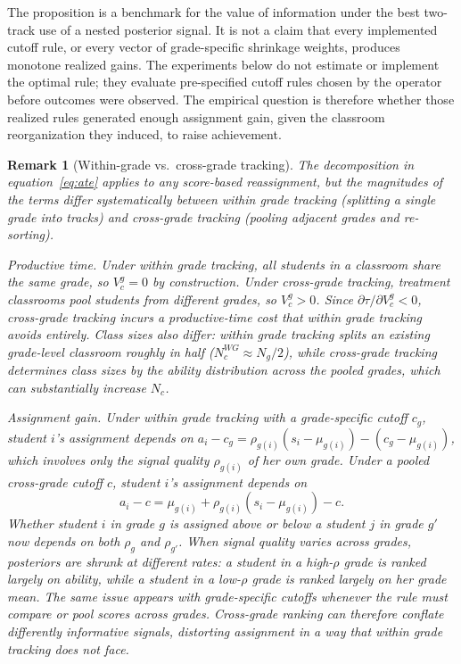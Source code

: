 \documentclass[11pt]{article}
\newtheorem{remark}{Remark}
\begin{document}
The proposition is a benchmark for the value of information under the best two-track use of a nested posterior signal. It is not a claim that every implemented cutoff rule, or every vector of grade-specific shrinkage weights, produces monotone realized gains. The experiments below do not estimate or implement the optimal rule; they evaluate pre-specified cutoff rules chosen by the operator before outcomes were observed. The empirical question is therefore whether those realized rules generated enough assignment gain, given the classroom reorganization they induced, to raise achievement.

\begin{remark}[Within-grade vs.\ cross-grade tracking]
\label{rem:wg_cg}
The decomposition in equation~\eqref{eq:ate} applies to any score-based reassignment, but the magnitudes of the terms differ systematically between within grade tracking (splitting a single grade into tracks) and cross-grade tracking (pooling adjacent grades and re-sorting).

\emph{Productive time.} Under within grade tracking, all students in a classroom share the same grade, so $V^g_c = 0$ by construction. Under cross-grade tracking, treatment classrooms pool students from different grades, so $V^g_c > 0$. Since $\partial\tau/\partial V^g_c < 0$, cross-grade tracking incurs a productive-time cost that within grade tracking avoids entirely. Class sizes also differ: within grade tracking splits an existing grade\mbox{-}level classroom roughly in half ($N^{WG}_c \approx N_g/2$), while cross-grade tracking determines class sizes by the ability distribution across the pooled grades, which can substantially increase $N_c$.

\emph{Assignment gain.} Under within grade tracking with a grade-specific cutoff $c_g$, student $i$'s assignment depends on $a_i - c_g = \rho_{g(i)}(s_i - \mu_{g(i)}) - (c_g - \mu_{g(i)})$, which involves only the signal quality $\rho_{g(i)}$ of her own grade. Under a pooled cross-grade cutoff $c$, student $i$'s assignment depends on
\begin{equation}
\label{eq:cg_assign}
a_i - c = \mu_{g(i)} + \rho_{g(i)}(s_i - \mu_{g(i)}) - c.
\end{equation}
Whether student $i$ in grade $g$ is assigned above or below a student $j$ in grade $g'$ now depends on both $\rho_g$ and $\rho_{g'}$. When signal quality varies across grades, posteriors are shrunk at different rates: a student in a high-$\rho$ grade is ranked largely on ability, while a student in a low-$\rho$ grade is ranked largely on her grade mean. The same issue appears with grade-specific cutoffs whenever the rule must compare or pool scores across grades. Cross-grade ranking can therefore conflate differently informative signals, distorting assignment in a way that within grade tracking does not face.
\end{remark}
\end{document}

